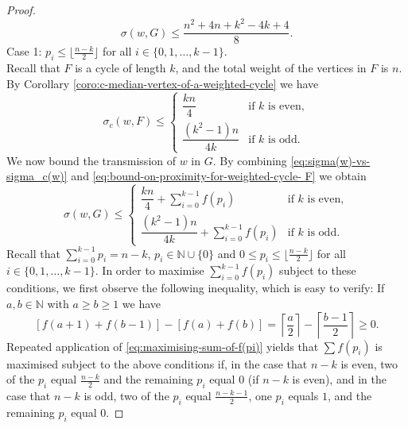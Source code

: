 \documentclass[a4paper,11pt]{article}
\numberwithin{equation}{theorem}
\begin{document}
\begin{proof}
\begin{equation} \label{eq:proximity of w in F}
\sigma(w,G) \leq  \frac{n^2+4n + k^2 - 4k +4}{8}.
\end{equation} 
{\sc Case 1:} $p_i \leq 
\lfloor \frac{n-k}{2} \rfloor $ 
for all $i \in \{0,1,\ldots,k-1\}$.\\[1mm]
Recall that $F$ is a cycle of length $k$, and the total weight of the vertices in $F$ is $n$. 
By Corollary \ref{coro:c-median-vertex-of-a-weighted-cycle} we have 
\begin{equation} \label{eq:bound-on-proximity-for-weighted-cycle- F}
\sigma_c(w, F) \leq
\begin{cases} 
\dfrac{kn}{4}  & \text{if } k \text{ is even}, \\[10pt]
\dfrac{(k^2-1)n}{4k}  & \text{if } k \text{ is odd}.
\end{cases}
\end{equation}
We now bound the transmission of $w$ in $G$. By combining \eqref{eq:sigma(w)-vs-sigma_c(w)} and 
\eqref{eq:bound-on-proximity-for-weighted-cycle- F} we obtain
\begin{equation} \label{eq:sigma(v_0)}
\sigma(w, G) \leq
\begin{cases} 
\dfrac{kn}{4} + \sum^{k-1}_{i=0} f(p_i) & \text{if } k \text{ is even}, \\[10pt]
\dfrac{(k^2-1)n}{4k} + \sum^{k-1}_{i=0} f(p_i) & \text{if } k \text{ is odd}.
\end{cases}
\end{equation}
Recall that $\sum_{i=0}^{k-1} p_i = n-k$, $p_i \in \mathbb{N}\cup \{0\}$ and 
$0 \leq p_i \leq \lfloor \frac{n-k}{2} \rfloor$ for all $i \in \{0,1,\ldots,k-1\}$. 
In order to maximise $\sum_{i=0}^{k-1}f(p_i)$ subject to these conditions,
we first observe the following inequality, which is easy to verify: If $a,b \in \mathbb{N}$ 
with $a \geq b \geq 1$ we have 
\begin{equation} \label{eq:maximising-sum-of-f(pi)} 
[ f(a+1) + f(b-1) ] - [ f(a) + f(b) ] 
    = \left\lceil \frac{a}{2} \right\rceil 
      - \left\lceil \frac{b-1}{2} \right\rceil
    \geq 0. 
\end{equation}    
Repeated application of \eqref{eq:maximising-sum-of-f(pi)} yields that $\sum f(p_i)$ is maximised subject to the above conditions if, in the case that $n-k$ is even,  
two of the $p_i$ equal $\frac{n-k}{2}$ and the remaining $p_i$ equal $0$ (if $n-k$ is even), and in the case that $n-k$ is odd, two of the $p_i$ equal $\frac{n-k-1}{2}$, one $p_i$ equals $1$, and the remaining $p_i$ equal $0$.

\end{proof}
\end{document}
